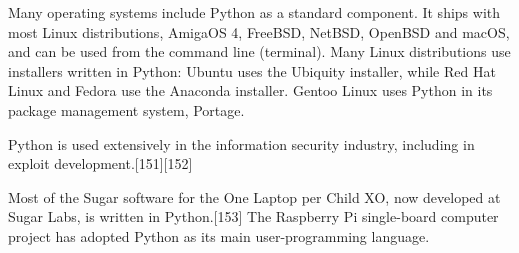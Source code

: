 \documentclass[conference]{IEEEtran} %
\begin{document}
Many operating systems include Python as a standard component. It ships with most Linux distributions, AmigaOS 4, FreeBSD, NetBSD, OpenBSD and macOS, and can be used from the command line (terminal). Many Linux distributions use installers written in Python: Ubuntu uses the Ubiquity installer, while Red Hat Linux and Fedora use the Anaconda installer. Gentoo Linux uses Python in its package management system, Portage.

Python is used extensively in the information security industry, including in exploit development.[151][152]

Most of the Sugar software for the One Laptop per Child XO, now developed at Sugar Labs, is written in Python.[153] The Raspberry Pi single-board computer project has adopted Python as its main user-programming language. 


\end{document}
